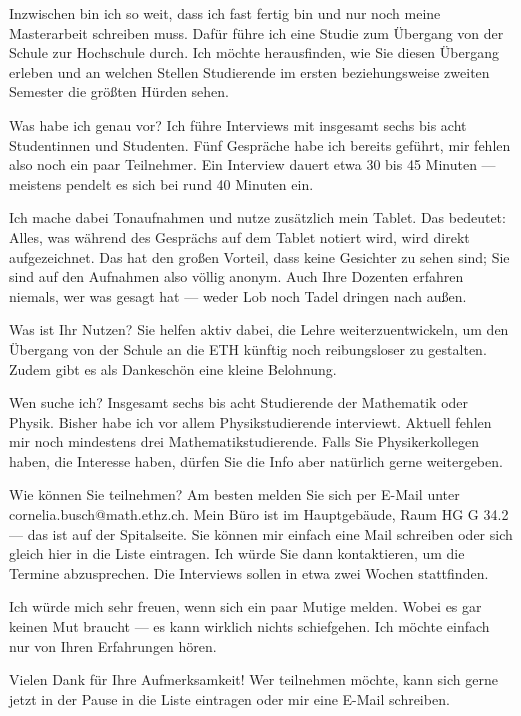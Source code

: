 \begin{spoken-clean}[00:43:54 - 00:46:52]
Inzwischen bin ich so weit, dass ich fast fertig bin und nur noch meine Masterarbeit schreiben muss. Dafür führe ich eine Studie zum Übergang von der Schule zur Hochschule durch. Ich möchte herausfinden, wie Sie diesen Übergang erleben und an welchen Stellen Studierende im ersten beziehungsweise zweiten Semester die größten Hürden sehen. 

Was habe ich genau vor? Ich führe Interviews mit insgesamt sechs bis acht Studentinnen und Studenten. Fünf Gespräche habe ich bereits geführt, mir fehlen also noch ein paar Teilnehmer. Ein Interview dauert etwa 30 bis 45 Minuten --- meistens pendelt es sich bei rund 40 Minuten ein. 

Ich mache dabei Tonaufnahmen und nutze zusätzlich mein Tablet. Das bedeutet: Alles, was während des Gesprächs auf dem Tablet notiert wird, wird direkt aufgezeichnet. Das hat den großen Vorteil, dass keine Gesichter zu sehen sind; Sie sind auf den Aufnahmen also völlig anonym. Auch Ihre Dozenten erfahren niemals, wer was gesagt hat --- weder Lob noch Tadel dringen nach außen. 

Was ist Ihr Nutzen? Sie helfen aktiv dabei, die Lehre weiterzuentwickeln, um den Übergang von der Schule an die ETH künftig noch reibungsloser zu gestalten. Zudem gibt es als Dankeschön eine kleine Belohnung. 

Wen suche ich? Insgesamt sechs bis acht Studierende der Mathematik oder Physik. Bisher habe ich vor allem Physikstudierende interviewt. Aktuell fehlen mir noch mindestens drei Mathematikstudierende. Falls Sie Physikerkollegen haben, die Interesse haben, dürfen Sie die Info aber natürlich gerne weitergeben. 

Wie können Sie teilnehmen? Am besten melden Sie sich per E-Mail unter cornelia.busch@math.ethz.ch. Mein Büro ist im Hauptgebäude, Raum HG G 34.2 --- das ist auf der Spitalseite. Sie können mir einfach eine Mail schreiben oder sich gleich hier in die Liste eintragen. Ich würde Sie dann kontaktieren, um die Termine abzusprechen. Die Interviews sollen in etwa zwei Wochen stattfinden. 

Ich würde mich sehr freuen, wenn sich ein paar Mutige melden. Wobei es gar keinen Mut braucht --- es kann wirklich nichts schiefgehen. Ich möchte einfach nur von Ihren Erfahrungen hören. 

Vielen Dank für Ihre Aufmerksamkeit! Wer teilnehmen möchte, kann sich gerne jetzt in der Pause in die Liste eintragen oder mir eine E-Mail schreiben.
\end{spoken-clean}

